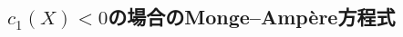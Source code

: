 \documentclass[dvipdfmx,a4paper,11pt]{article} %
\theoremstyle{definition}
\theoremstyle{remark}
\numberwithin{equation}{section}
\DeclareMathOperator{\Ric}{Ric}
\newcommand{\underalign}[2]{%
  \quad
  \underset{\mathclap{\raisebox{-1.6ex}{\ensuremath{\scriptstyle #1}}}}{#2}
  \quad
}
\begin{document}

\subsection{$c_1(X)<0$の場合のMonge--Amp\`ere方程式}
\end{document}
